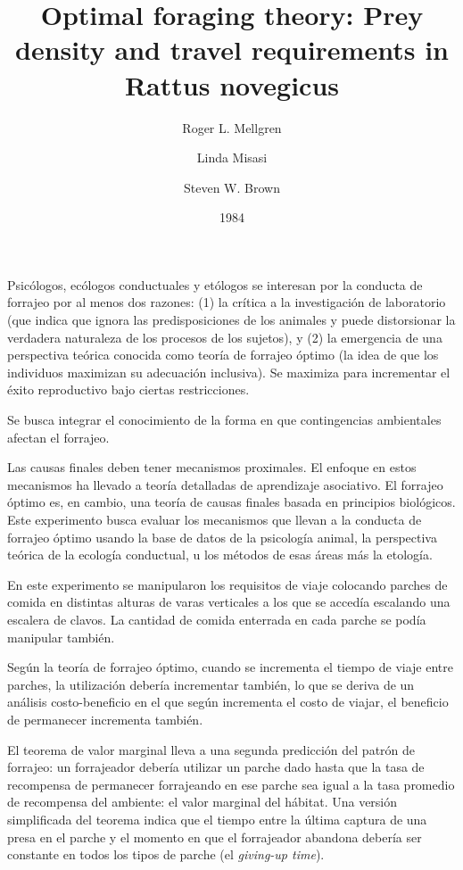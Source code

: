 \documentclass[a4paper,12pt]{article}
\title{Optimal foraging theory: Prey density and travel requirements in Rattus novegicus}
\author{Roger L. Mellgren \and Linda Misasi \and Steven W. Brown}
\date{1984}
\begin{document}
{\scshape\bfseries \maketitle}

Psicólogos, ecólogos conductuales y etólogos se interesan por la conducta de forrajeo por al menos dos razones: (1) la crítica a la investigación de laboratorio (que indica que ignora las predisposiciones de los animales y puede distorsionar la verdadera naturaleza de los procesos de los sujetos), y (2) la emergencia de una perspectiva teórica conocida como teoría de forrajeo óptimo (la idea de que los individuos maximizan su adecuación inclusiva). Se maximiza para incrementar el éxito reproductivo bajo ciertas restricciones.

Se busca integrar el conocimiento de la forma en que contingencias ambientales afectan el forrajeo.

Las causas finales deben tener mecanismos proximales. El enfoque en estos mecanismos ha llevado a teoría detalladas de aprendizaje asociativo. El forrajeo óptimo es, en cambio, una teoría de causas finales basada en principios biológicos.
Este experimento busca evaluar los mecanismos que llevan a la conducta de forrajeo óptimo usando la base de datos de la psicología animal, la perspectiva teórica de la ecología conductual, u los métodos de esas áreas más la etología.

En este experimento se manipularon los requisitos de viaje colocando parches de comida en distintas alturas de varas verticales a los que se accedía escalando una escalera de clavos. La cantidad de comida enterrada en cada parche se podía manipular también.

Según la teoría de forrajeo óptimo, cuando se incrementa el tiempo de viaje entre parches, la utilización debería incrementar también, lo que se deriva de un análisis costo-beneficio en el que según incrementa el costo de viajar, el beneficio de permanecer incrementa también.

El teorema de valor marginal lleva a una segunda predicción del patrón de forrajeo: un forrajeador debería utilizar un parche dado hasta que la tasa de recompensa de permanecer forrajeando en ese parche sea igual a la tasa promedio de recompensa del ambiente: el valor marginal del hábitat. Una versión simplificada del teorema indica que el tiempo entre la última captura de una presa en el parche y el momento en que el forrajeador abandona debería ser constante en todos los tipos de parche (el {\itshape giving-up time}). 
\end{document}
